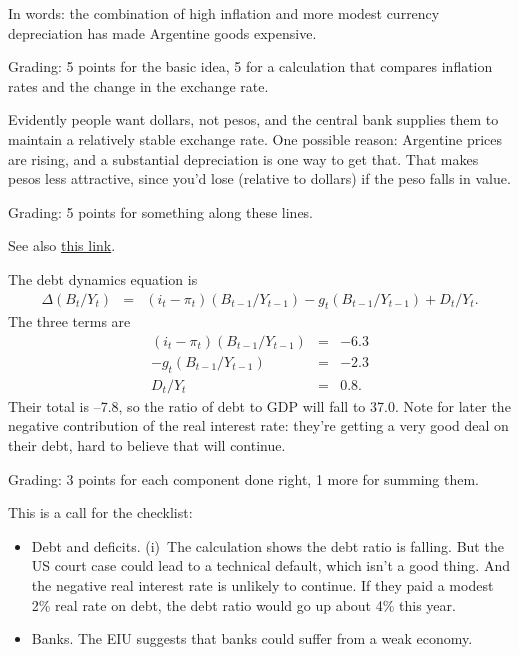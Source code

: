 \documentclass[letterpaper,12pt]{exam}
\begin{document}
\begin{questions}
\begin{solution}
\begin{parts}
In words:  the combination of high inflation and
more modest currency depreciation has made Argentine goods expensive.

Grading:  5 points for the basic idea, 5 for a calculation that compares
inflation rates and the change in the exchange rate.

\item Evidently people want dollars, not pesos, and the central bank supplies
them to maintain a relatively stable exchange rate.
One possible reason:  Argentine prices are rising,
and a substantial depreciation is one way to get that.
That makes pesos less attractive, since you'd lose (relative to dollars)
if the peso falls in value.

Grading:  5 points for something along these lines.

See also \href{http://focoeconomico.org/2013/12/22/el-drenaje-de-reservas-del-bcra-una-amenaza-al-sistema-financiero/}
{this link}.

\item The debt dynamics equation is
\begin{eqnarray*}
   \Delta (B_t/Y_t)  &=&  (i_t - \pi_t)(B_{t-1}/Y_{t-1})
                - g_t (B_{t-1}/Y_{t-1}) + D_t/Y_t .
\end{eqnarray*}
The three terms are
\begin{eqnarray*}
    (i_t - \pi_t)(B_{t-1}/Y_{t-1}) &=&  -6.3  \\
    - g_t (B_{t-1}/Y_{t-1})   &=&  -2.3 \\
    D_t/Y_t  &=&  0.8 .
\end{eqnarray*}
Their total is --7.8, so the ratio of debt to GDP will fall to 37.0.
Note for later the negative contribution of the real interest rate:
they're getting a very good deal on their debt, hard to believe that will
continue.

Grading:  3 points for each component done right, 1 more for summing them.

\item This is a call for the checklist:
\begin{itemize}
\item Debt and deficits.
(i)~The calculation shows the debt ratio is falling.
But the US court case could lead to a technical default,
which isn't a good thing.
And the negative real interest rate is unlikely to continue.
If they paid a modest 2\% real rate on debt, the debt ratio would
go up about 4\% this year.

\item Banks.
The EIU suggests that banks could suffer from a weak economy.


\end{itemize}
\end{parts}
\end{solution}
\end{questions}
\end{document}
